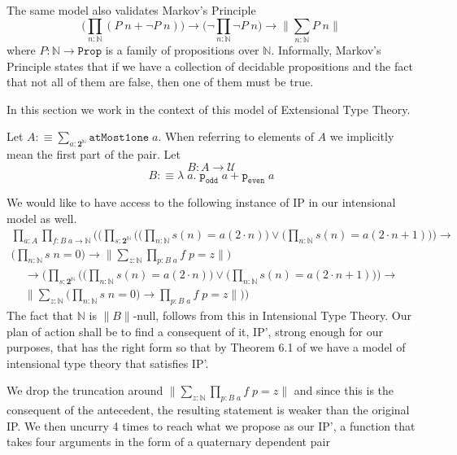 \documentclass[12pt]{report}
\begin{document}
The same model also validates Markov's Principle
$$\Big(\prod_{n : \mathbb{N}}(P\; n + \neg P\; n)\Big) \rightarrow  \Big(\neg \prod_{n : \mathbb{N}}\neg P\; n\Big)\rightarrow \Big\lVert \sum_{n : \mathbb{N}} P\; n \Big\rVert$$
where $P : \mathbb{N} \rightarrow \mathtt{Prop}$ is a family of propositions over $\mathbb{N}$. 
Informally, Markov's Principle states that if we have a collection of decidable propositions and the fact that not all of them are false, then one of them must be true.

In this section we work in the context of this model of Extensional Type Theory.

Let $A :\equiv \sum_{a: \mathbf{2}^\mathbb{N}}\mathtt{atMost1one}\;a$. 
When referring to elements of $A$ we implicitly mean the first part of the pair. 
Let
$$B : A \rightarrow \mathcal{U}$$
$$B :\equiv \lambda\; a.\; \mathtt{p_{odd}}\; a + \mathtt{p_{even}}\; a$$

We would like to have access to the following instance of IP in our intensional model as well.
\begin{multline*}
\prod_{a: A} \prod_{f: B\; a \rightarrow \mathbb{N}} \Bigg( \bigg( \prod_{s : \mathbf{2}^\mathbb{N}} \Big(\big(\prod_{n : \mathbb{N}} s(n) = a(2 \cdot n)\big) \vee \big(\prod_{n : \mathbb{N}} s(n) = a(2\cdot n +1)\big) \Big) \rightarrow \\
	 \Big(\prod_{n : \mathbb{N}}s\; n = 0 \Big) \rightarrow \Big\lVert \sum_{z : \mathbb{N}} \prod_{p : B\; a} f\; p = z \Big\rVert \bigg)
\end{multline*}
\begin{multline*}
\rightarrow \bigg( \prod_{s : \mathbf{2}^\mathbb{N}} \Big(\big(\prod_{n : \mathbb{N}} s(n) = a(2 \cdot n)\big) \vee \big(\prod_{n : \mathbb{N}} s(n) = a(2\cdot n +1)\big) \Big) \rightarrow \\
	  \Big\lVert \sum_{z : \mathbb{N}} \Big(\prod_{n : \mathbb{N}}s\; n = 0 \Big) \rightarrow \prod_{p : B\; a} f\; p = z \Big\rVert \bigg) \Bigg)
\end{multline*}
The fact that $\mathbb{N}$ is $\lVert B \rVert$-null, follows from this in Intensional Type Theory. 
Our plan of action shall be to find a consequent of it, IP', strong enough for our purposes, that has the right form so that by Theorem 6.1 of \cite{1905.03014} we have a model of intensional type theory that satisfies IP'. 

We drop the truncation around $\lVert \sum_{z : \mathbb{N}} \prod_{p : B\; a} f\; p = z \rVert$ and since this is the consequent of the antecedent, the resulting statement is weaker than the original IP. We then uncurry 4 times to reach what we propose as our IP', a function that takes four arguments in the form of a quaternary dependent pair
\end{document}
